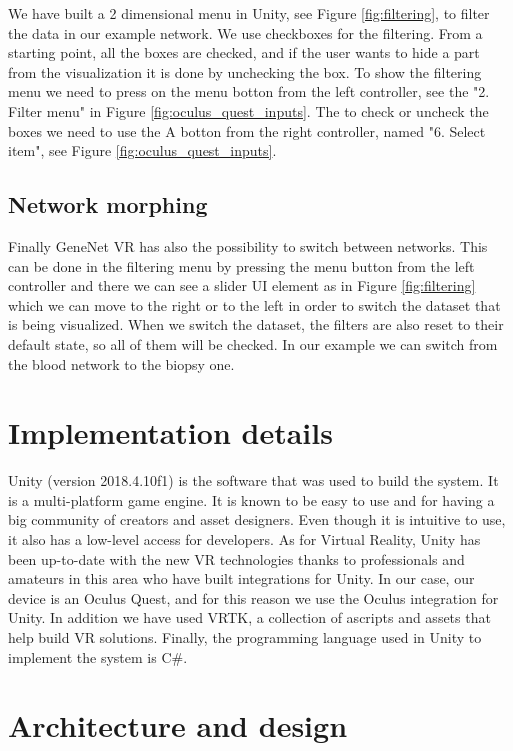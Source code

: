 We have built a 2 dimensional menu in Unity, see Figure \ref{fig:filtering}, to filter the data in our example network. We use checkboxes for the filtering. From a starting point, all the boxes are checked, and if the user wants to hide a part from the visualization it is done by unchecking the box. To show the filtering menu we need to press on the menu botton from the left controller, see the "2. Filter menu" in Figure \ref{fig:oculus_quest_inputs}. The to check or uncheck the boxes we need to use the A botton from the right controller, named "6. Select item", see Figure \ref{fig:oculus_quest_inputs}.

\subsection{Network morphing}
Finally GeneNet VR has also the possibility to switch between networks. This can be done in the filtering menu by pressing the menu button from the left controller and there we can see a slider UI element as in Figure \ref{fig:filtering} which we can move to the right or to the left in order to switch the dataset that is being visualized. When we switch the dataset, the filters are also reset to their default state, so all of them will be checked. In our example we can switch from the blood network to the biopsy one.

\section{Implementation details}
Unity (version 2018.4.10f1\cite{unity2018}) is the software that was used to build the system. It is a multi-platform game engine. It is known to be easy to use and for having a big community of creators and asset designers\cite{developing_vr_unity}. Even though it is intuitive to use, it also has a low-level access for developers. As for Virtual Reality, Unity has been up-to-date with the new VR technologies thanks to professionals and amateurs in this area who have built integrations for Unity. In our case, our device is an Oculus Quest, and for this reason we use the Oculus integration for Unity\cite{oculus_unity_integration}. In addition we have used VRTK, a collection of ascripts and assets that help build VR solutions\cite{vrtk_what}. Finally, the programming language used in Unity to implement the system is C\#.

\section{Architecture and design}

